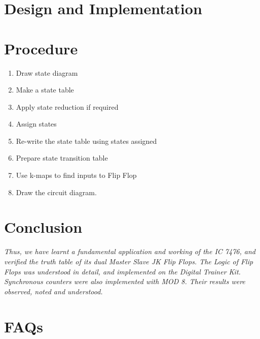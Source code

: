 \documentclass[11pt]{article}
\begin{document}
\section{Design and Implementation}




\section{Procedure}

\begin{enumerate}
	\item Draw state diagram
	\item Make a state table
	\item Apply state reduction if required
	\item Assign states
	\item Re-write the state table using states assigned
	\item Prepare state transition table
	\item Use k-maps to find inputs to Flip Flop
	\item Draw the circuit diagram.

\end{enumerate}

\section{Conclusion}
\textit{Thus, we have learnt a fundamental application and working of the IC 7476, and verified the truth table of its dual Master Slave JK Flip Flops. The Logic of Flip Flops was understood in detail, and implemented on the Digital Trainer Kit. Synchronous counters were also implemented with MOD 8. Their results were observed, noted and understood. }
\pagebreak

\section{FAQs}
\end{document}
